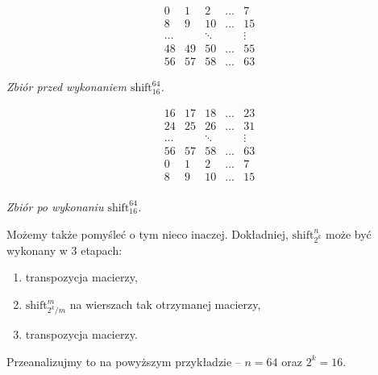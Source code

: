 \documentclass[a4paper]{article}
\newcommand{\shift}[2]{\text{shift}_{#2}^{#1}}
\theoremstyle{definition}
\begin{document}
\begin{minipage}{.5\textwidth} %

\[
\begin{matrix}
 0 &  1 &  2 &  \ldots & 7 \\
 8 &  9 & 10 &  \ldots & 15 \\
\ldots & & \ddots &  & \vdots \\
48 & 49 & 50 & \ldots & 55 \\
56 & 57 & 58 & \ldots & 63 
\end{matrix}
\]

\begin{center} \it
    Zbiór przed wykonaniem \(\shift {64} {16}\).
\end{center}

\end{minipage} %
\begin{minipage}{.5\textwidth} %

\[
\begin{matrix}
16 & 17 & 18 & \ldots & 23 \\
24 & 25 & 26 & \ldots & 31 \\
\ldots & & \ddots &  & \vdots \\
56 & 57 & 58 & \ldots & 63 \\
0 &  1 &  2 &  \ldots & 7 \\
8 &  9 & 10 &  \ldots & 15 \\
\end{matrix}
\]

\begin{center} \it
    Zbiór po wykonaniu \(\shift {64} {16}\).
\end{center}
\end{minipage}

\vspace{1em}

Możemy także pomyśleć o tym nieco inaczej. Dokładniej, \(\shift n {2^k}\) może być wykonany w 3 etapach:

\begin{enumerate}
    \item transpozycja macierzy,
    \item \(\shift {m} {2^k/m}\) na wierszach tak otrzymanej macierzy,
    \item transpozycja macierzy.
\end{enumerate}

Przeanalizujmy to na powyższym przykładzie -- \(n = 64\) oraz \(2^k = 16\).

\vspace{0.5em}
\end{document}
